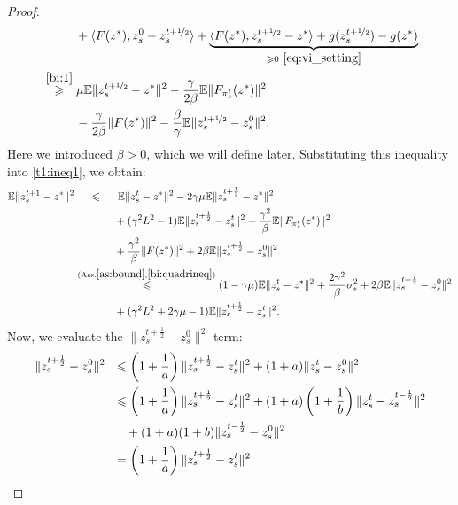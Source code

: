 \documentclass{article}
\begin{document}
\begin{proof}
\begin{align*}
            &~~ \quad ~~~+ \langle F(z^*), z_s^0 - z_s^{t+\nicefrac{1}{2}}\rangle + \underbrace{\langle F(z^*), z_s^{t+\nicefrac{1}{2}} - z^*\rangle + g(z_s^{t+\nicefrac{1}{2}}) - g(z^*)}_{\geqslant 0 ~\eqref{eq:vi_setting}}\\
            &\overset{\eqref{bi:1}}{\geqslant} \mu \mathbb{E} \|z_s^{t+\nicefrac{1}{2}} - z^*\|^2 - \frac{\gamma}{2\beta} \mathbb{E}\|F_{\pi_s^t}(z^*)\|^2 \\
            & ~~ \quad ~~~- \frac{\gamma}{2\beta}\|F(z^*)\|^2 - \frac{\beta}{\gamma}\mathbb{E}\|z_s^{t+\nicefrac{1}{2}} - z_s^0\|^2.
        \end{align*}
        Here we introduced $\beta > 0$, which we will define later. Substituting this inequality into \eqref{t1:ineq1}, we obtain:
        \begin{align}
            \notag \mathbb E\|z_s^{t+1} - z^*\|^2  & ~ \quad \leqslant \quad ~ \mathbb E\|z_s^t - z^*\|^2 - 2\gamma\mu \mathbb E\|z_s^{t+\frac{1}{2}} - z^*\|^2 \\
            \notag
            &\quad \quad \quad ~~+ (\gamma^2 L^2 - 1)\mathbb E\|z_s^{t+\frac{1}{2}} - z_s^t\|^2 + \frac{\gamma^2}{\beta}\mathbb E \|F_{\pi_s^t}(z^*)\|^2 \\
            \notag
            & \quad \quad \quad ~~+ \frac{\gamma^2}{\beta} \|F(z^*)\|^2 + 2\beta\mathbb E\|z_s^{t+\frac{1}{2}} - z_s^0\|^2\\
            \notag
            &\overset{(\text{Ass.} \ref{as:bound}, \ref{bi:quadrineq})}{\leqslant}(1 - \gamma\mu)\mathbb E\|z_s^t - z^*\|^2 + \frac{2\gamma^2}{\beta}\sigma_*^2 + 2\beta\mathbb E\|z_s^{t+\frac{1}{2}} - z_s^0\|^2 \\
            \label{t1:ineq2}
            &\quad \quad \quad ~~+ (\gamma^2 L^2 + 2\gamma\mu - 1)\mathbb E\|z_s^{t+\frac{1}{2}} - z_s^t\|^2.
        \end{align}
        Now, we evaluate the $\|z_s^{t+\frac{1}{2}} - z_s^0\|^2$ term:
        \begin{align}
            \notag\|z_s^{t+\frac{1}{2}} - z_s^0\|^2 &~~\leqslant \left(1 + \frac{1}{a}\right)\|z_s^{t + \frac{1}{2}} - z_s^t\|^2 + (1 + a)\|z_s^t - z_s^0\|^2 \\
            \notag &~~\leqslant \left(1 + \frac{1}{a}\right)\|z_s^{t + \frac{1}{2}} - z_s^t\|^2 + (1 + a)\left(1 + \frac{1}{b}\right)\|z_s^t - z_s^{t - \frac{1}{2}}\|^2 \\
            \notag & ~~\quad + (1 + a)(1 + b)\|z_s^{t - \frac{1}{2}} - z_s^0\|^2 \\
            \notag &~~= \left(1 + \frac{1}{a}\right)\|z_s^{t + \frac{1}{2}} - z_s^t\|^2 \\

\end{align}
\end{proof}
\end{document}
